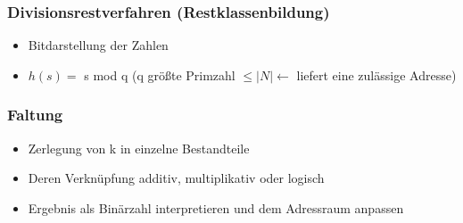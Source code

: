 \documentclass[a4paper]{article}
\begin{document}
    \subsubsection{Divisionsrestverfahren (Restklassenbildung)}
    \begin{itemize}
        \item Bitdarstellung der Zahlen
        \item $h(s) =$ s mod q (q größte Primzahl $ \le |N| \leftarrow $ liefert eine zulässige Adresse)
    \end{itemize}
    
    \subsubsection{Faltung}
    \begin{itemize}
        \item Zerlegung von k in einzelne Bestandteile
        \item Deren Verknüpfung additiv, multiplikativ oder logisch
        \item Ergebnis als Binärzahl interpretieren und dem Adressraum anpassen
    \end{itemize}
    
\end{document}

